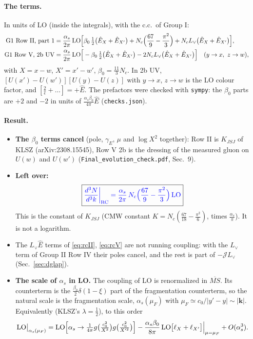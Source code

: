 \documentclass[10pt]{article}
\numberwithin{equation}{section}
\newcommand{\new}[1]{{\color{blue}#1}}
\newcommand{\Lv}{L_{\vee}}
\newcommand{\JJ}{\mathcal J}
\newcommand{\Eh}{\hat E}
\begin{document}
\paragraph{The terms.} In units of LO (inside the integrals), with the c.c.\ of Group I:
\begin{align}
\text{G1 Row II, part 1}&=\frac{\alpha_s}{2\pi}\,{\rm LO}\Big[\beta_0\,\tfrac12\big(\Eh_X+\Eh_{X'}\big)+N_c\Big(\frac{67}{9}-\frac{\pi^2}{3}\Big)+N_c\Lv\big(\Eh_X+\Eh_{X'}\big)\Big],\label{eq:rcII}\\
\text{G1 Row V, 2b UV}&=\frac{\alpha_s}{2\pi}\,{\rm LO}\Big[-\beta_0\,\tfrac12\big(\Eh_X+\Eh_{X'}\big)-2N_c\Lv\big(\Eh_X+\Eh_{X'}\big)\Big]\quad(y\to x,\ z\to w),\label{eq:rcV}
\end{align}
with $X=x-w$, $X'=x'-w'$, $\beta_0=\frac{11}{3}N_c$. In 2b UV, $[U(x')-U(w')][U(y)-U(z)]$ with $y\to x$, $z\to w$ is the LO colour factor, and $[\frac2\epsilon+\dots]=+\Eh$. The prefactors were checked with \texttt{sympy}: the $\beta_0$ parts are $+2$ and $-2$ in units of $\frac{\alpha_s\beta_0}{4\pi}\Eh$ (\texttt{checks.json}).
\paragraph{Result.}
\begin{itemize}
\item \textbf{The $\beta_0$ terms cancel} (pole, $\gamma_E$, $\mu$ and $\log X^2$ together): Row II is $K_{JSJ}$ of KLSZ (arXiv:2308.15545), Row V 2b is the dressing of the measured gluon on $U(w)$ and $U(w')$ (\texttt{Final\_evolution\_check.pdf}, Sec.~9).
\item \textbf{Left over:}
\begin{equation}
\boxed{\new{\frac{d^3N}{d^3k}\bigg|_{\rm RC}=\frac{\alpha_s}{2\pi}\,N_c\Big(\frac{67}{9}-\frac{\pi^2}{3}\Big)\,{\rm LO}}}
\label{eq:rc}
\end{equation}
This is the constant of $K_{JSJ}$ (CMW constant $K=N_c(\frac{67}{18}-\frac{\pi^2}{6})$, times $\frac{\alpha_s}{\pi}$). It is not a logarithm.
\item The $\Lv\Eh$ terms of \eqref{eq:rcII}, \eqref{eq:rcV} are not running coupling: with the $\Lv$ term of Group II Row IV their poles cancel, and the rest is part of $-\JJ\Lv$ (Sec.~\ref{sec:dglap}).
\item \textbf{The scale of $\alpha_s$ in LO.} The coupling of LO is renormalized in $\overline{MS}$. Its counterterm is the $\frac{\beta_0}{2}\delta(1-\xi)$ part of the fragmentation counterterm, so the natural scale is the fragmentation scale, $\alpha_s(\mu_F)$ with $\mu_F\simeq c_0/|y'-y|\sim|\mathbf k|$. Equivalently (KLSZ's $\lambda=\frac12$), to this order
\begin{equation*}
{\rm LO}\big|_{\alpha_s(\mu_F)}={\rm LO}\Big[\alpha_s\to\tfrac{1}{4\pi}g\big(\tfrac{c_0^2}{X^2}\big)g\big(\tfrac{c_0^2}{X'^2}\big)\Big]-\frac{\alpha_s\beta_0}{8\pi}\,{\rm LO}\big[\ell_X+\ell_{X'}\big]\Big|_{\mu=\mu_F}+O(\alpha_s^3).
\end{equation*}
\end{itemize}
\end{document}
